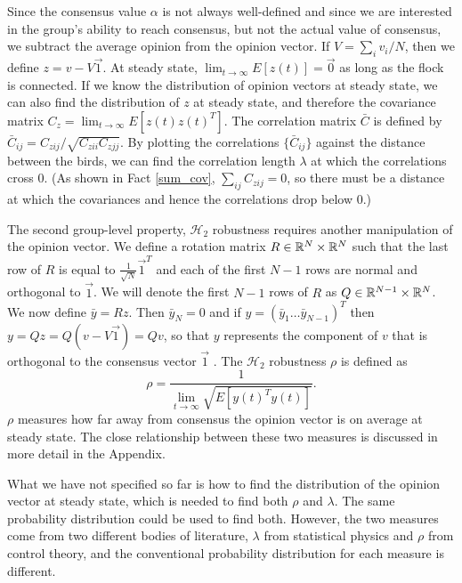 \documentclass{article}
\DeclareRobustCommand{\cite}[1]{\citep{#1}}
\newcommand{\Tr}{\text{Tr}}
\begin{document}
Since the consensus value $\alpha$ is not always well-defined and since we are interested in the group's ability to reach consensus, but not the actual value of consensus, we subtract the average opinion from the opinion vector. If $V=\sum_iv_i/N$, then we define $z=v-V\vec{1}$. At steady state, $\lim_{t\to\infty}E[z(t)]=\vec{0}$ as long as the flock is connected. If we know the distribution of opinion vectors at steady state, we can also find the distribution of $z$ at steady state, and therefore the covariance matrix $C_z=\lim_{t\to\infty}E[z(t)z(t)^T]$.  The correlation matrix $\bar{C}$ is defined by $\bar{C}_{ij}=C_{zij}/\sqrt{C_{zii}C_{zjj}}$. By plotting the correlations $\{\bar{C}_{ij}\}$ against the distance between the birds, we can find the correlation length $\lambda$ at which the correlations cross $0$. (As shown in Fact \ref{sum_cov}, $\sum_{ij}C_{zij}=0$, so there must be a distance at which the covariances and hence the correlations drop below $0$.)

The second group-level property, $\mathscr{H}_2$ robustness requires another manipulation of the opinion vector. We define a rotation matrix $R\in{\mathbb{R}}^N\times{\mathbb{R}}^N$ such that the last row of $R$ is equal to $\frac{1}{\sqrt{N}}\vec{1}^T$ and each of the first $N-1$ rows are normal and orthogonal to $\vec{1}$.  We will denote the first $N-1$ rows of $R$ as $Q\in{\mathbb{R}}^{N-1}\times{\mathbb{R}}^N$. 
We now define $\bar{y}=Rz$. Then $\bar{y}_N=0$ and if $y=(\bar{y}_1\dots\bar{y}_{N-1})^T$ then $y=Qz=Q(v-V\vec{1})=Qv$, so that $y$ represents the component of $v$ that is orthogonal to the consensus vector $\vec{1}$ \cite{Young:2010fk,Young:2013kx}. The $\mathscr{H}_2$ robustness $\rho$ is defined as 
\begin{equation*}
\rho=\frac{1}{\lim_{t\to\infty}\sqrt{E[y(t)^Ty(t)]}}.
\end{equation*}
$\rho$ measures how far away from consensus the opinion vector is on average at steady state. The close relationship between these two measures is discussed in more detail in the Appendix.

What we have not specified so far is how to find the distribution of the opinion vector at steady state, which is needed to find both $\rho$ and $\lambda$. The same probability distribution could be used to find both. However, the two measures come from two different bodies of literature, $\lambda$ from statistical physics and $\rho$ from control theory, and the conventional probability distribution for each measure is different. 
\end{document}

